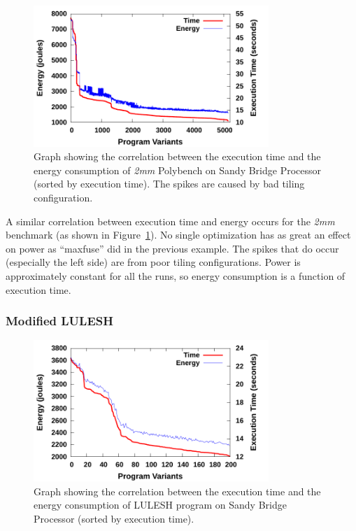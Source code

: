 \begin{figure}[bt]
    \includegraphics[width=3.5in]{2mm}
    \caption{Graph showing the correlation between the execution time and the
energy consumption of \emph{2mm} Polybench on Sandy Bridge Processor (sorted by execution time).
The spikes are caused by bad tiling configuration.}
    \label{fig:2mm-TE}
\end{figure}

A similar correlation between execution time and energy occurs for the \emph{2mm} benchmark 
(as shown in Figure~\ref{fig:2mm-TE}). No single optimization has as great an effect on power
as ``maxfuse'' did in the previous example. The spikes that do occur (especially the left side)
are from poor tiling configurations. Power is approximately constant for all the runs, so energy
consumption is a function of execution time.

\subsubsection{Modified LULESH}

\begin{figure}[bt]
    \includegraphics[width=3.5in]{lulesh-correlation}
    \caption{Graph showing the correlation between the execution time and the 
energy consumption of LULESH program on Sandy Bridge Processor (sorted by execution 
time).}    
    \label{fig:lulesh-correlation}
\end{figure}

